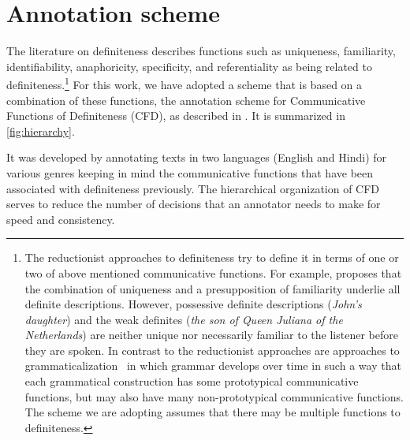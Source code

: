 \documentclass[11pt,letterpaper]{article}
\newcommand{\ensuretext}[1]{#1}
\newcommand{\nssmarker}{\ensuretext{\textcolor{magenta}{\ensuremath{^{\textsc{NS}}_{\textsc{S}}}}}}
\newcommand{\abmarker}{\ensuretext{\textcolor{red}{\ensuremath{^{\textsc{A}}_{\textsc{B}}}}}}
\newcommand{\arkcomment}[3]{\ensuretext{\textcolor{#3}{[#1 #2]}}}
\newcommand{\nss}[1]{\arkcomment{\nssmarker}{#1}{magenta}}
\newcommand{\ab}[1]{\arkcomment{\abmarker}{#1}{red}}
\begin{document}

\section{Annotation scheme}\label{sec:scheme}

The literature on definiteness describes functions such as 
uniqueness, familiarity, identifiability, anaphoricity, specificity, and 
referentiality \citep[\textit{inter alia}]{birner94,condoravdi92,evans77,evans80,gundel88,gundel93,heim90,kadmon87,kadmon90,lyons99,prince92,roberts03,russell05} as being related to definiteness.\footnote{The reductionist approaches to definiteness try to define it in terms of one or two of above mentioned communicative functions.   
For example, \citet{roberts03} proposes that the combination of uniqueness and a presupposition of familiarity 
underlie all definite descriptions.  However, possessive definite descriptions ({\it John's daughter}) 
and the weak definites ({\it the son of Queen Juliana of the Netherlands}) are neither unique nor necessarily 
familiar to the listener before they are spoken. In contrast to the reductionist approaches are approaches to grammaticalization~\citep{hopper-03} in which grammar develops over time in such a way that 
each grammatical construction has some prototypical communicative functions, 
but may also have many non-prototypical communicative functions. The scheme we are adopting assumes that there may be multiple functions to definiteness.} For this work, we have adopted a scheme that is based on a combination of these functions, the annotation scheme for Communicative Functions of Definiteness (CFD), as described in \citet{bhatia14}.
It is summarized in \cref{fig:hierarchy}.
  
It was developed by annotating texts in two languages (English and Hindi) for various genres keeping in mind the communicative functions that have been associated with definiteness previously. The hierarchical organization of CFD serves to reduce the number of decisions that an annotator needs to make
for speed and consistency.
\end{document}
